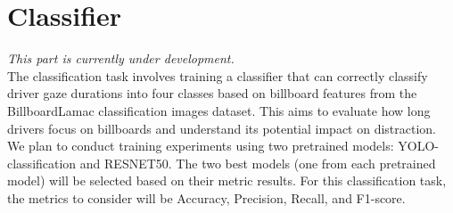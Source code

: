 \section{Classifier}\label{sec:classifier}

\textit{This part is currently under development.}\\

The classification task involves training a classifier that can correctly classify driver gaze durations into four classes based on billboard features from the BillboardLamac classification images dataset. This aims to evaluate how long drivers focus on billboards and understand its potential impact on distraction. We plan to conduct training experiments using two pretrained models: YOLO-classification and RESNET50. The two best models (one from each pretrained model) will be selected based on their metric results. For this classification task, the metrics to consider will be Accuracy, Precision, Recall, and F1-score.